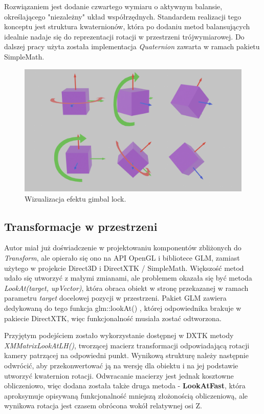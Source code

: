 Rozwiązaniem jest dodanie czwartego wymiaru o aktywnym balansie, określającego "niezależny" układ współrzędnych. Standardem realizacji tego konceptu jest struktura kwaternionów, która po dodaniu metod balansujących idealnie nadaje się do reprezentacji rotacji w przestrzeni trójwymiarowej. Do dalszej pracy użyta została implementacja \textit{Quaternion} zawarta w ramach pakietu SimpleMath.

\vfill

\begin{figure}[h!]
	\centering
	\includegraphics[width=\textwidth]{images/gimbal_lock.png}
	\caption{Wizualizacja efektu gimbal lock.}
	\label{GimbalLock}
\end{figure}

\subsection{Transformacje w przestrzeni}
Autor miał już doświadczenie w projektowaniu komponentów zbliżonych do \textit{Transform}, ale opierało się ono na API OpenGL i bibliotece GLM, zamiast użytego w projekcie Direct3D i DirectXTK / SimpleMath. Większość metod udało się utworzyć z małymi zmianami, ale problemem okazała się być metoda \textit{LookAt(target, upVector)}, która obraca obiekt w stronę przekazanej w ramach parametru \textit{target} docelowej pozycji w przestrzeni. Pakiet GLM zawiera dedykowaną do tego funkcja glm::lookAt() \cite{glm:docs:look_at}, której odpowiednika brakuje w pakiecie DirectXTK, więc funkcjonalność musiała zostać odtworzona. 

Przyjętym podejściem zostało wykorzystanie dostępnej w DXTK metody \textit{XMMatrixLookAtLH()}, tworzącej macierz transformacji odpowiadającą rotacji kamery patrzącej na odpowiedni punkt. Wynikową strukturę należy następnie odwrócić, aby przekonwertować ją na wersję dla obiektu i na jej podstawie utworzyć kwaternion rotacji. Odwracanie macierzy jest jednak kosztowne obliczeniowo, więc dodana została także druga metoda - \textbf{LookAtFast}, która aproksymuje opisywaną funkcjonalność mniejszą złożonością obliczeniową, ale wynikowa rotacja jest czasem obrócona wokół relatywnej osi Z.

